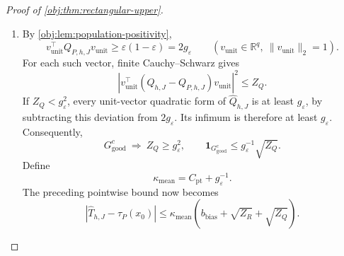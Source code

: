 \documentclass[11pt]{article}
\begin{document}
\begin{proof}[Proof of \cref{obj:thm:rectangular-upper}]
\begin{enumerate}
The inverse identity and the residual decomposition are
\[
\widehat Q_{h,J}^{-1}\widehat R_{h,J}-\vartheta
=
\widehat Q_{h,J}^{-1}
 (\widehat R_{h,J}-\widehat Q_{h,J}\vartheta),
\]
\[
\widehat R_{h,J}-\widehat Q_{h,J}\vartheta
=
(\widehat R_{h,J}-\bar R)
+(\bar R-Q_{P,h,J}\vartheta)
+(Q_{P,h,J}-\widehat Q_{h,J})\vartheta.
\]
The triangle inequality and rowwise Cauchy--Schwarz imply
\[
\|\widehat R_{h,J}-\widehat Q_{h,J}\vartheta\|_2
\le
\sqrt{Z_R}
+C_{\mathrm{bias}}b_{\mathrm{bias}}
+C_{\mathrm{loc}}\sqrt{Z_Q}.
\]
Because both arm means lie in \([0,1]\),
\[
\tau_P(x_0)\in[-1,1].
\]
Clipping toward this interval decreases absolute error: below its lower endpoint the clipped endpoint lies between the value and the target, above its upper endpoint the same holds, and inside the interval clipping preserves the value. Thus, on \(G_{\mathrm{good}}\),
\[
\begin{aligned}
|\widehat T_{h,J}-\tau_P(x_0)|
&\le g_\varepsilon^{-1}\|r_0\|_2
 \|\widehat R_{h,J}-\widehat Q_{h,J}\vartheta\|_2\\
&\le g_\varepsilon^{-1}C_{\mathrm{loc}}
 \left(\sqrt{Z_R}
 +C_{\mathrm{bias}}b_{\mathrm{bias}}
 +C_{\mathrm{loc}}\sqrt{Z_Q}\right).
\end{aligned}
\]
Define the positive finite constant
\[
C_{\mathrm{pt}}
=g_\varepsilon^{-1}C_{\mathrm{loc}}
 (1+C_{\mathrm{bias}}+C_{\mathrm{loc}}).
\]
All three coefficients in the preceding parentheses are at most
\(1+C_{\mathrm{bias}}+C_{\mathrm{loc}}\). On the complementary event the decision is zero and its error is at most \(1\). Combining these branches gives, on every sample,
\[
|\widehat T_{h,J}-\tau_P(x_0)|
\le
C_{\mathrm{pt}}
 (b_{\mathrm{bias}}+\sqrt{Z_R}+\sqrt{Z_Q})
+\mathbf1_{G_{\mathrm{good}}^c}.
\]%

\item By \cref{obj:lem:population-positivity},
\[
v_{\mathrm{unit}}^\top Q_{P,h,J}v_{\mathrm{unit}}
\ge\varepsilon(1-\varepsilon)=2g_\varepsilon
\qquad
(v_{\mathrm{unit}}\in\mathbb R^q,\ \|v_{\mathrm{unit}}\|_2=1).
\]
For each such vector, finite Cauchy--Schwarz gives
\[
\left|
v_{\mathrm{unit}}^\top
(\widehat Q_{h,J}-Q_{P,h,J})v_{\mathrm{unit}}
\right|^2
\le Z_Q.
\]
If \(Z_Q<g_\varepsilon^2\), every unit-vector quadratic form of
\(\widehat Q_{h,J}\) is at least \(g_\varepsilon\), by subtracting this deviation from \(2g_\varepsilon\). Its infimum is therefore at least \(g_\varepsilon\). Consequently,
\[
G_{\mathrm{good}}^c
\ \Longrightarrow\
Z_Q\ge g_\varepsilon^2,
\qquad
\mathbf1_{G_{\mathrm{good}}^c}
\le g_\varepsilon^{-1}\sqrt{Z_Q}.
\]
Define
\[
\kappa_{\mathrm{mean}}=C_{\mathrm{pt}}+g_\varepsilon^{-1}.
\]
The preceding pointwise bound now becomes
\[
|\widehat T_{h,J}-\tau_P(x_0)|
\le
\kappa_{\mathrm{mean}}
 (b_{\mathrm{bias}}+\sqrt{Z_R}+\sqrt{Z_Q}).
\]


\end{enumerate}
\end{proof}
\end{document}
